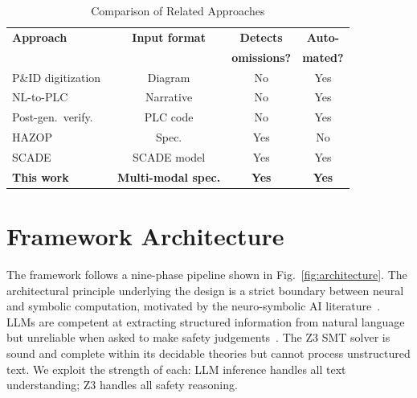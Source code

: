 \documentclass[conference]{IEEEtran}
\begin{document}
\begin{table}[t]
\caption{Comparison of Related Approaches}
\label{tab:comparison}
\centering
\small
\begin{tabular}{@{}lccc@{}}
\toprule
\textbf{Approach} & \textbf{Input format} & \textbf{Detects} & \textbf{Auto-}\\
 & & \textbf{omissions?} & \textbf{mated?} \\
\midrule
P\&ID digitization~\cite{paliwal2021digitize}  & Diagram        & No          & Yes \\
NL-to-PLC~\cite{koziolek2023chatgpt}           & Narrative      & No          & Yes \\
Post-gen.\ verify.~\cite{mery2011event_b}      & PLC code       & No          & Yes \\
HAZOP~\cite{leveson2011}             & Spec.          & Yes         & No  \\
SCADE~\cite{scade}                   & SCADE model    & Yes         & Yes \\
\textbf{This work}                   & \textbf{Multi-modal spec.} & \textbf{Yes} & \textbf{Yes} \\
\bottomrule
\end{tabular}
\end{table}

\section{Framework Architecture}

The framework follows a nine-phase pipeline shown in
Fig.~\ref{fig:architecture}. The architectural principle underlying the
design is a strict boundary between neural and symbolic computation,
motivated by the neuro-symbolic AI literature~\cite{garcez2019}.
LLMs are competent at extracting structured information from natural
language~\cite{qwen2024} but unreliable when asked to make safety
judgements~\cite{huang2023hallucination}. The Z3 SMT solver is sound and
complete within its decidable theories but cannot process unstructured text.
We exploit the strength of each: LLM inference handles all text
understanding; Z3 handles all safety reasoning.
\end{document}

